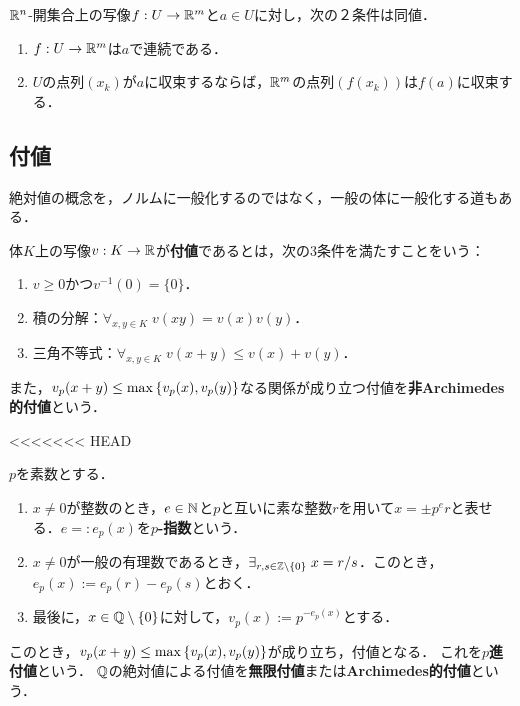 \documentclass[uplatex,dvipdfmx]{jsreport}
\begin{document}
\begin{proposition}[連続写像の点列による特徴付け]
    $\mathbb{R}^n$-開集合上の写像$f:U\to\mathbb{R}^m$と$a\in U$に対し，次の２条件は同値．
    \begin{enumerate}
        \item $f:U\to\mathbb{R}^m$は$a$で連続である．
        \item $U$の点列$(x_k)$が$a$に収束するならば，$\mathbb{R}^m$の点列$(f(x_k))$は$f(a)$に収束する．
    \end{enumerate}
\end{proposition}

\subsection{付値}

\begin{tcolorbox}[colframe=ForestGreen, colback=ForestGreen!10!white,breakable,colbacktitle=ForestGreen!40!white,coltitle=black,fonttitle=\bfseries\sffamily,
title=]
    絶対値の概念を，ノルムに一般化するのではなく，一般の体に一般化する道もある．
\end{tcolorbox}

\begin{definition}[valuation]
    体$K$上の写像$v:K\to\mathbb{R}$が\textbf{付値}であるとは，次の3条件を満たすことをいう：
    \begin{enumerate}
        \item $v\ge0$かつ$v^{-1}(0)=\{0\}$．
        \item 積の分解：$\forall_{x,y\in K}\;v(xy)=v(x)v(y)$．
        \item 三角不等式：$\forall_{x,y\in K}\;v(x+y)\le v(x)+v(y)$．
    \end{enumerate}
    また，$v_p(x+y)\le\max\left\{v_p(x),v_p(y)\right\}$なる関係が成り立つ付値を\textbf{非Archimedes的付値}という．
\end{definition}

<<<<<<< HEAD
\begin{example}
    $p$を素数とする．
    \begin{enumerate}
        \item $x\ne0$が整数のとき，$e\in\mathbb{N}$と$p$と互いに素な整数$r$を用いて$x=\pm p^er$と表せる．$e=:e_p(x)$を\textbf{$p$-指数}という．
        \item $x\ne0$が一般の有理数であるとき，$\exists_{r,s\in\mathbb{Z}\setminus\{0\}}\;x=r/s$．このとき，$e_p(x):=e_p(r)-e_p(s)$とおく．
        \item 最後に，$x\in\mathbb{Q}\setminus\{0\}$に対して，$v_p(x):=p^{-e_p(x)}$とする．
    \end{enumerate}
    このとき，$v_p(x+y)\le\max\left\{v_p(x),v_p(y)\right\}$が成り立ち，付値となる．
    これを\textbf{$p$進付値}という．
    $\mathbb{Q}$の絶対値による付値を\textbf{無限付値}または\textbf{Archimedes的付値}という．
\end{example}
\end{document}
